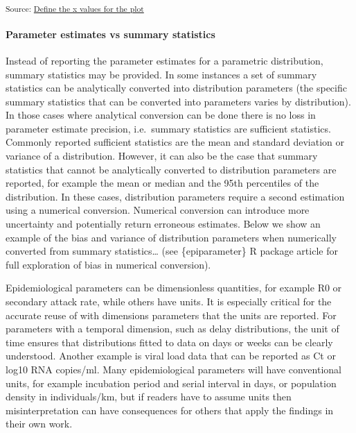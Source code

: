 \documentclass[
  10pt,
  letterpaper,
]{article}
\begin{document}
\begin{figure}[H]
{{}

\subcaption{\label{fig-dist-params-2}}

}

\caption{\label{fig-dist-params}}

\end{figure}%

\textsubscript{Source:
\href{https://joshwlambert.github.io/epiparameterReportingGuidance/use_cases/dist_params-preview.html\#cell-fig-dist-params}{Define
the x values for the plot}}

\paragraph{Parameter estimates vs summary
statistics}\label{parameter-estimates-vs-summary-statistics}

Instead of reporting the parameter estimates for a parametric
distribution, summary statistics may be provided. In some instances a
set of summary statistics can be analytically converted into
distribution parameters (the specific summary statistics that can be
converted into parameters varies by distribution). In those cases where
analytical conversion can be done there is no loss in parameter estimate
precision, i.e.~summary statistics are sufficient statistics. Commonly
reported sufficient statistics are the mean and standard deviation or
variance of a distribution. However, it can also be the case that
summary statistics that cannot be analytically converted to distribution
parameters are reported, for example the mean or median and the 95th
percentiles of the distribution. In these cases, distribution parameters
require a second estimation using a numerical conversion. Numerical
conversion can introduce more uncertainty and potentially return
erroneous estimates. Below we show an example of the bias and variance
of distribution parameters when numerically converted from summary
statistics\ldots{} (see \{epiparameter\} R package article for full
exploration of bias in numerical conversion).

Epidemiological parameters can be dimensionless quantities, for example
R0 or secondary attack rate, while others have units. It is especially
critical for the accurate reuse of with dimensions parameters that the
units are reported. For parameters with a temporal dimension, such as
delay distributions, the unit of time ensures that distributions fitted
to data on days or weeks can be clearly understood. Another example is
viral load data that can be reported as Ct or log10 RNA copies/ml. Many
epidemiological parameters will have conventional units, for example
incubation period and serial interval in days, or population density in
individuals/km, but if readers have to assume units then
misinterpretation can have consequences for others that apply the
findings in their own work.
\end{document}
